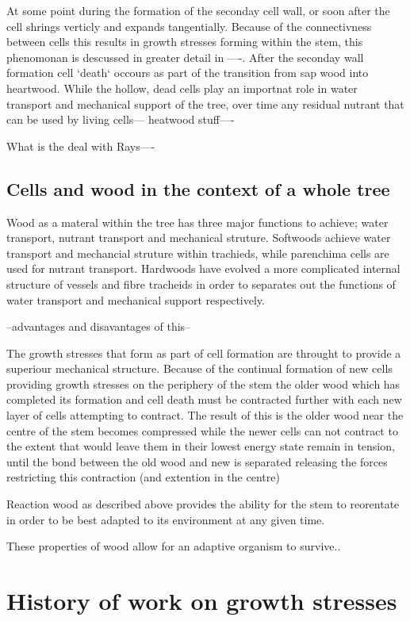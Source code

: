 \documentclass{article}
\begin{document}
At some point during the formation of the seconday cell wall, or soon after the
cell shrings verticly and expands tangentially. Because of the connectivness
between cells this results in growth stresses forming within the stem, this
phenomonan is descussed in greater detail in ----. After the seconday wall
formation cell `death` occours as part of the transition from sap wood into
heartwood. While the hollow, dead cells play an importnat role in water
transport and mechanical support of the tree, over time any residual nutrant
that can be used by living cells--- heatwood stuff----

What is the deal with Rays----

\subsection{Cells and wood in the context of a whole tree}
Wood as a materal within the tree has three major functions to achieve; water
transport, nutrant transport and mechanical struture. Softwoods achieve
water transport and mechancial struture within trachieds, while parenchima cells
are used for nutrant transport. Hardwoods have evolved a more complicated
internal structure of vessels and fibre tracheids in order to separates out the
functions of water transport and mechanical support respectively.

--advantages and disavantages of this--

The growth stresses that form as part of cell formation are throught to provide
a superiour mechanical structure. Because of the continual formation of new
cells providing growth stresses on the periphery of the stem the older wood
which has completed its formation and cell death must be contracted further with each
new layer of cells attempting to contract. The result of this is the older wood
near the centre of the stem becomes compressed while the newer cells can not
contract to the extent that would leave them in their lowest energy state
remain in tension, until the bond between the old wood and new is separated
releasing the forces restricting this contraction (and extention in the centre)

Reaction wood as described above provides the ability for the stem to reorentate
in order to be best adapted to its environment at any given time.

These properties of wood allow for an adaptive organism to survive..

\section{History of work on growth stresses}
\end{document}
